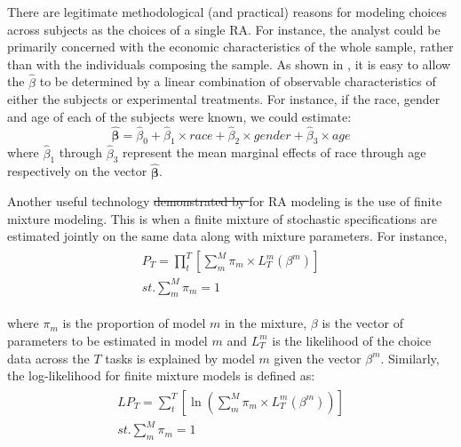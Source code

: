 \documentclass[11pt,a4paper]{article} %
\providecommand{\DIFdeltex}[1]{{\protect\color{red}\sout{#1}}}                      %
\providecommand{\DIFaddbegin}{} %
\providecommand{\DIFaddend}{} %
\providecommand{\DIFdelbegin}{} %
\providecommand{\DIFdelend}{} %
\providecommand{\DIFdel}[1]{\texorpdfstring{\DIFdeltex{#1}}{}} %
\newcommand{\DIFscaledelfig}{0.5}
\newlength{\DIFdelgraphicswidth} %
\newlength{\DIFdelgraphicsheight} %
\newcommand{\DIFaddincludegraphics}[2][]{{\color{blue}\fbox{\DIFOincludegraphics[#1]{#2}}}} %
\newcommand{\DIFdelincludegraphics}[2][]{%
\sbox{\DIFdelgraphicsbox}{\DIFOincludegraphics[#1]{#2}}%
\settoboxwidth{\DIFdelgraphicswidth}{\DIFdelgraphicsbox} %
\settoboxtotalheight{\DIFdelgraphicsheight}{\DIFdelgraphicsbox} %
\scalebox{\DIFscaledelfig}{%
\parbox[b]{\DIFdelgraphicswidth}{\usebox{\DIFdelgraphicsbox}\\[-\baselineskip] \rule{\DIFdelgraphicswidth}{0em}}\llap{\resizebox{\DIFdelgraphicswidth}{\DIFdelgraphicsheight}{%
\setlength{\unitlength}{\DIFdelgraphicswidth}%
\begin{picture}(1,1)%
\thicklines\linethickness{2pt} %
{\color[rgb]{1,0,0}\put(0,0){\framebox(1,1){}}}%
{\color[rgb]{1,0,0}\put(0,0){\line( 1,1){1}}}%
{\color[rgb]{1,0,0}\put(0,1){\line(1,-1){1}}}%
\end{picture}%
}\hspace*{3pt}}} %
} %
\DeclareRobustCommand{\DIFaddbegin}{\DIFOaddbegin \let\includegraphics\DIFaddincludegraphics} %
\DeclareRobustCommand{\DIFaddend}{\DIFOaddend \let\includegraphics\DIFOincludegraphics} %
\DeclareRobustCommand{\DIFdelbegin}{\DIFOdelbegin \let\includegraphics\DIFdelincludegraphics} %
\DeclareRobustCommand{\DIFdelend}{\DIFOaddend \let\includegraphics\DIFOincludegraphics} %
\begin{document}
There are legitimate methodological (and practical) reasons for modeling choices across subjects as the choices of a single RA.
For instance, the analyst could be primarily concerned with the economic characteristics of the whole sample, rather than with the individuals composing the sample.
As shown in \textcite[142]{Harrison2008a}, it is easy to allow the $\hat{\beta}$ to be determined by a linear combination of observable characteristics of either the subjects or experimental treatments.
For instance, if the race, gender and age of each of the subjects were known, we could estimate:
\begin{equation}
	\DIFdelbegin %
\DIFdelend \DIFaddbegin \label{eq:BB}
	\DIFaddend \bm{\hat{\beta}} = \hat{\beta}_0 + \hat{\beta}_1 \times \mathit{race} + \hat{\beta}_2 \times \mathit{gender} + \hat{\beta}_3 \times \mathit{age}
\end{equation}
\noindent where $\hat{\beta}_1$ through $\hat{\beta}_3$ represent the mean marginal effects of race through age respectively on the vector $\bm{\hat{\beta}}$.
\DIFdelbegin %

\DIFdelend Another useful technology \DIFdelbegin \DIFdel{demonstrated by \textcite{Harrison2008a} }\DIFdelend for RA modeling is the use of finite mixture modeling.
This is when a finite mixture of stochastic specifications are estimated jointly on the same data along with mixture parameters.
For instance,
\begin{align}
	\DIFdelbegin %
\DIFdelend \DIFaddbegin \label{eq:PT_Mix}
	\DIFaddend \begin{split}
		\bm{\mathit{P_T}} = \prod_t^T \left[ \sum_m^M \pi_m \times L_T^m(\beta^m) \right]\\ 
		\mathit{st.} \sum_m^M \pi_m = 1
	\end{split}
\end{align}

\noindent where $\pi_m$ is the proportion of model $m$ in the mixture, $\beta$ is the vector of parameters to be estimated in model $m$ and $L_T^m$ is the likelihood of the choice data across the $T$ tasks is explained by model $m$ given the vector $\beta^m$.
Similarly, the log-likelihood for finite mixture models is defined as:
\begin{align}
	\DIFdelbegin %
\DIFdelend \DIFaddbegin \label{eq:LPT_Mix}
	\DIFaddend \begin{split}
		\bm{\mathit{LP_T}} = \sum_t^T \left[ \ln \left( \sum_m^M \pi_m \times L_T^m(\beta^m) \right) \right]\\ 
		\mathit{st.} \sum_m^M \pi_m = 1
	\end{split}
\end{align}
\end{document}
